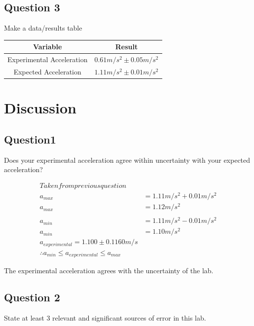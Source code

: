 \documentclass{article}
\begin{document}
\subsection{Question 3}
Make a data/results table

\begin{center}
	\begin{tabular}{|c|c|}
		\hline
		Variable & Result\\
		\hline \hline
		Experimental Acceleration & $0.61m/s^2\pm0.05m/s^2$\\
		\hline
		Expected Acceleration & $1.11m/s^2 \pm 0.01m/s^2$\\
		\hline
	\end{tabular}
\end{center}

\pagebreak

\section{Discussion}

\subsection{Question1}
Does your experimental acceleration agree within uncertainty with your expected acceleration?

\begin{align*}
Taken from previous question\\
a_{max}		& = 1.11m/s^2 + 0.01m/s^2\\
a_{max} 	& = 1.12m/s^2\\
\\
a_{min}		& = 1.11m/s^2 - 0.01m/s^2\\
a_{min}		& = 1.10m/s^2
\\
a_{experimental} = 1.100\pm0.1160m/s\\
\therefore a_{min}\leq a_{experimental}\leq  a_{max}
\end{align*}

The experimental acceleration agrees with the uncertainty of the lab.


\subsection{Question 2}
State at least 3 relevant and significant sources of error in this lab.
\end{document}
